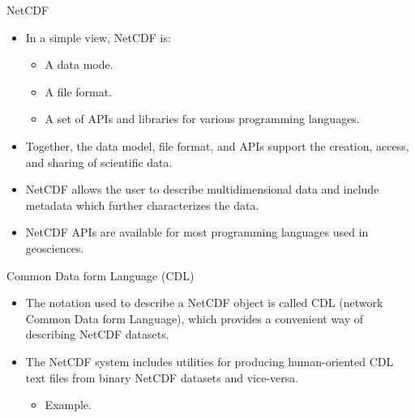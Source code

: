 \documentclass[compress,11pt,xcolor=svgnames,aspectratio=169]{beamer}
\begin{document}
\begin{frame}[t]{NetCDF}

\begin{itemize}
\setlength\itemsep{0.4cm}

\item In a simple view, NetCDF is:

    \begin{itemize}
        \item A data mode.
        \item A file format.
        \item A set of APIs and libraries for various programming languages.
    \end{itemize}

\item Together, the data model, file format, and APIs support the creation, access, and sharing of scientific data.

\item NetCDF allows the user to describe multidimensional data and include metadata which further characterizes the data.

\item NetCDF APIs are available for most programming languages used in geosciences.

\end{itemize}

\nocite{netcdf}

\end{frame}

\begin{frame}[t]{Common Data form Language (CDL)}

\begin{itemize}
\setlength\itemsep{0.3cm}

\item The notation used to describe a NetCDF object is called CDL (network Common Data form Language), which provides a convenient way of describing NetCDF datasets.

\item The NetCDF system includes utilities for producing human-oriented CDL text files from binary NetCDF datasets and vice-versa.

    \begin{itemize}
        \item Example.
    \end{itemize}

\end{itemize}

\nocite{netcdf}

\end{frame}
\end{document}
